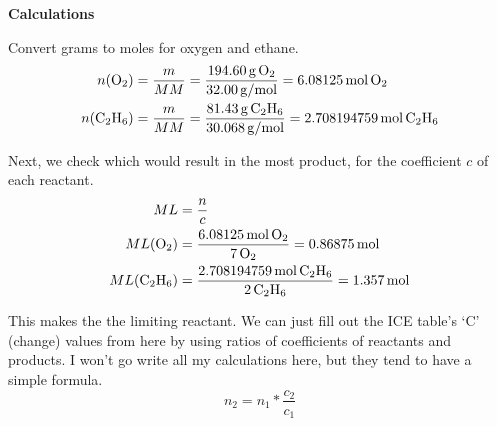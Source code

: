\documentclass[10pt]{article}
\begin{document}
            \textbf{Calculations}

            Convert grams to moles for oxygen and ethane.
            \begin{align}
                n(\ce{O2})  &=  \frac{m}{MM}
                    =   \frac{194.60\,\unit{\gram}\,\ce{O2}}{32.00\,\unit{\gram/\mole}}
                    =   6.08125\,\unit{\mole}\,\ce{O2}\\
                n(\ce{C2H6})    &=  \frac{m}{MM}
                    =   \frac{81.43\,\unit{\gram}\,\ce{C2H6}}{30.068\,\unit{\gram/\mole}}
                    =   2.708194759\,\unit{\mole}\,\ce{C2H6}
            \end{align}

            Next, we check which would result in the most product, for the coefficient $c$ of each reactant.
            \begin{align}
                ML  &=  \frac{n}{c}\\
                ML(\ce{O2})     &=  \frac{6.08125\,\unit{\mole}\,\ce{O2}}{7\,\ce{O2}}
                    =   0.86875\,\unit{\mole}\\
                ML(\ce{C2H6})   &=  \frac{2.708194759\,\unit{\mole}\,\ce{C2H6}}{2\,\ce{C2H6}}
                    =   1.357\,\unit{\mole}
            \end{align}

            This makes the  the limiting reactant.
            We can just fill out the ICE table's `C' (change) values from here by using ratios of coefficients of reactants and products.
            I won't go write all my calculations here, but they tend to have a simple formula.
            \begin{equation}
                n_2 =   n_1 * \frac{c_2}{c_1}
            \end{equation}
\end{document}
